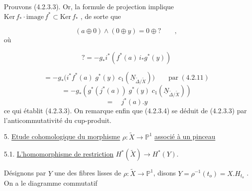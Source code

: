 Prouvons (4.2.3.3). Or, la formule de projection implique $\mathrm{Ker}\, f_* \cdot \mathrm{image}\, f^* \subset \mathrm{Ker}\, f_*$ , de sorte que

\begin{equation*}
(a \oplus 0) \wedge (0 \oplus y) = 0 \oplus ? \qquad ,
\end{equation*}
où

\begin{equation}\tag{4.3.3}
? = - g_*i^*(f^*(a)\, i_*g^*(y)) 
\end{equation}


\begin{equation*}
 = - g_*\bigl(i^*f^*(a) \; g^*(y) \; c_1(\underline{N}_{\widetilde{\Delta}/\widetilde{X}})\bigr) \qquad \mathrm{par} \; (4.2.11)
\end{equation*}
\begin{equation*}
= - g_*(g^*(j^*(a)) \; g^*(y) \; c_1(\underline{N}_{\widetilde{\Delta}/\widetilde{X}}))
\end{equation*}
\begin{equation*}
= \quad j^*(a).y
\end{equation*}
ce qui établit (4.2.3.3). On remarque enfin que (4.2.3.4) se déduit de (4.2.3.3) par l'anticommutativité du cup-produit.


5. \underline{Etude cohomologique du morphisme} $\rho : \widetilde{X} \longrightarrow \mathbb{P}^1$ \underline{associé à un pinceau}


5.1. \underline{L'homomorphisme de restriction} $H^*(\widetilde{X}) \longrightarrow H^*(Y)$.

Désignons par $Y$ une des fibres lisses de $\rho : \widetilde{X} \longrightarrow \mathbb{P}^1$, disons $Y = \rho^{-1}(t_o) = X.H_{t_o}$ . On a le diagramme commutatif

